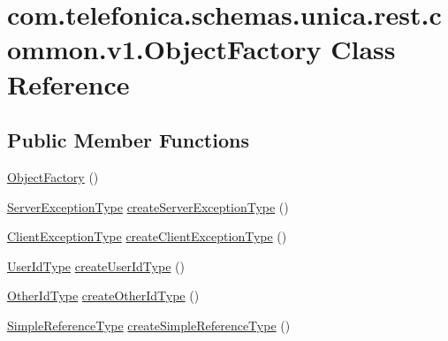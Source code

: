 \hypertarget{classcom_1_1telefonica_1_1schemas_1_1unica_1_1rest_1_1common_1_1v1_1_1ObjectFactory}{
\section{com.telefonica.schemas.unica.rest.common.v1.ObjectFactory Class Reference}
\label{classcom_1_1telefonica_1_1schemas_1_1unica_1_1rest_1_1common_1_1v1_1_1ObjectFactory}
}
\subsection*{Public Member Functions}
\begin{DoxyCompactItemize}
\item 
\hyperlink{classcom_1_1telefonica_1_1schemas_1_1unica_1_1rest_1_1common_1_1v1_1_1ObjectFactory_aad12db239ad7d3718a3e60b872026dde}{ObjectFactory} ()
\item 
\hyperlink{classcom_1_1telefonica_1_1schemas_1_1unica_1_1rest_1_1common_1_1v1_1_1ServerExceptionType}{ServerExceptionType} \hyperlink{classcom_1_1telefonica_1_1schemas_1_1unica_1_1rest_1_1common_1_1v1_1_1ObjectFactory_a41d9ca74202c82e1d30ad1803c9160d9}{createServerExceptionType} ()
\item 
\hyperlink{classcom_1_1telefonica_1_1schemas_1_1unica_1_1rest_1_1common_1_1v1_1_1ClientExceptionType}{ClientExceptionType} \hyperlink{classcom_1_1telefonica_1_1schemas_1_1unica_1_1rest_1_1common_1_1v1_1_1ObjectFactory_a8e4d663a2454758798b08692c1c1c6ec}{createClientExceptionType} ()
\item 
\hyperlink{classcom_1_1telefonica_1_1schemas_1_1unica_1_1rest_1_1common_1_1v1_1_1UserIdType}{UserIdType} \hyperlink{classcom_1_1telefonica_1_1schemas_1_1unica_1_1rest_1_1common_1_1v1_1_1ObjectFactory_a204895ffaac2e2e4ab9062772d74d813}{createUserIdType} ()
\item 
\hyperlink{classcom_1_1telefonica_1_1schemas_1_1unica_1_1rest_1_1common_1_1v1_1_1OtherIdType}{OtherIdType} \hyperlink{classcom_1_1telefonica_1_1schemas_1_1unica_1_1rest_1_1common_1_1v1_1_1ObjectFactory_a909a1f6ee2e88d410675d159159b385b}{createOtherIdType} ()
\item 
\hyperlink{classcom_1_1telefonica_1_1schemas_1_1unica_1_1rest_1_1common_1_1v1_1_1SimpleReferenceType}{SimpleReferenceType} \hyperlink{classcom_1_1telefonica_1_1schemas_1_1unica_1_1rest_1_1common_1_1v1_1_1ObjectFactory_a3f1c173e930634c22137bf95a904c5bd}{createSimpleReferenceType} ()

\end{DoxyCompactItemize}
